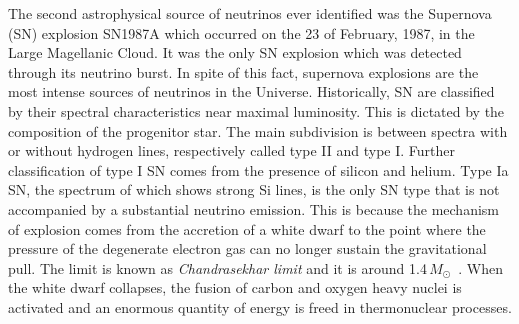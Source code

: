 The second astrophysical source of neutrinos ever identified was the Supernova (SN) explosion SN1987A %
which occurred on the 23 of February, 1987, in the Large Magellanic Cloud.
It was the only SN explosion which was detected through its neutrino burst.
In spite of this fact, supernova explosions are the most intense sources of neutrinos in the Universe.
Historically, SN are classified by their spectral characteristics near maximal luminosity.
This is dictated by the composition of the progenitor star.
The main subdivision is between spectra with or without hydrogen lines, respectively called %
type II and type I.
Further classification of type I SN comes from the presence of silicon and helium.
Type Ia SN, the spectrum of which shows strong Si lines, is the only SN type that is not accompanied %
by a substantial neutrino emission.
This is because the mechanism of explosion comes from the accretion of a white dwarf to the point where %
the pressure of the degenerate electron gas can no longer sustain the gravitational pull.
The limit is known as \emph{Chandrasekhar limit} and it is around 1.4\,$M_\odot$~\cite{Chandrasekhar:1931ih}.
When the white dwarf collapses, the fusion of carbon and oxygen heavy nuclei is activated %
and an enormous quantity of energy is freed in thermonuclear processes.


